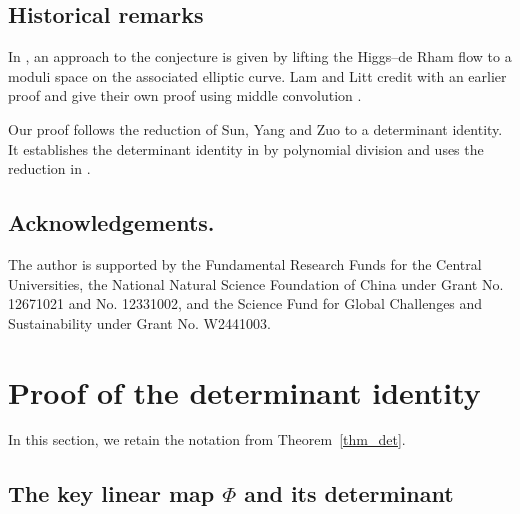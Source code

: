 \documentclass{amsart}
\numberwithin{equation}{section}
\begin{document}
\subsection*{Historical remarks}

In \cite{LSW}, an approach to the conjecture is given by
lifting the Higgs--de Rham flow to a moduli space on the associated
elliptic curve. Lam and Litt credit
\cite{LSW} with an earlier proof and give their own proof using middle
convolution \cite[Theorem~1.11 and \S5]{LL}. 

Our proof follows the reduction of Sun, Yang and Zuo to a determinant identity. It establishes the determinant identity in \cite[Conjecture~A.1]{SYZ} by polynomial division and uses the reduction in \cite[Proposition~A.9]{SYZ}.


\subsection*{Acknowledgements.}
The author is supported by the Fundamental Research Funds for the Central Universities, the National Natural Science Foundation of China under Grant No. 12671021 and No. 12331002, and the Science Fund for Global Challenges and Sustainability under Grant No. W2441003.





\section{Proof of the determinant identity}

In this section, we retain the notation from Theorem~\ref{thm_det}.



\subsection{The key linear map $\Phi$ and its determinant}
\label{subsec_target-bases}
\end{document}
